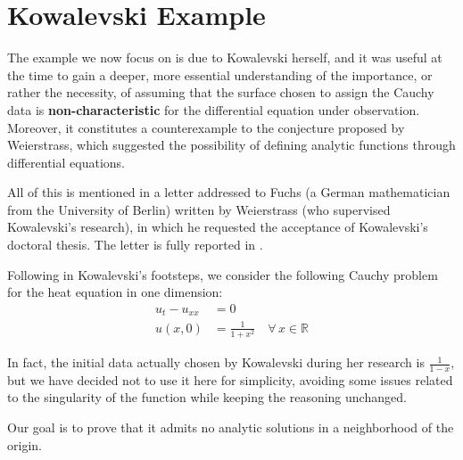 \newpage
\section{Kowalevski Example}

The example we now focus on is due to Kowalevski herself, and it was useful at the time to gain a deeper, more essential understanding of the importance, or rather the necessity, of assuming that the surface chosen to assign the Cauchy data is \textbf{non-characteristic} for the differential equation under observation. Moreover, it constitutes a counterexample to the conjecture proposed by Weierstrass, which suggested the possibility of defining analytic functions through differential equations.

All of this is mentioned in a letter addressed to Fuchs (a German mathematician from the University of Berlin) written by Weierstrass (who supervised Kowalevski's research), in which he requested the acceptance of Kowalevski’s doctoral thesis. The letter is fully reported in \cite[app.C]{Bio}.

Following in Kowalevski's footsteps, we consider the following Cauchy problem for the heat equation in one dimension:
\begin{align}
\label{eq:1}
u_t-u_{xx}&=0\\
\label{eq:2}
u(x,0)&=\frac{1}{1+x^2} \quad \forall \, x \in \mathbb{R}
\end{align}
\begin{remark}
In fact, the initial data actually chosen by Kowalevski during her research is $\frac{1}{1-x}$, but we have decided not to use it here for simplicity, avoiding some issues related to the singularity of the function while keeping the reasoning unchanged.
\end{remark}
Our goal is to prove that it admits no analytic solutions in a neighborhood of the origin.

